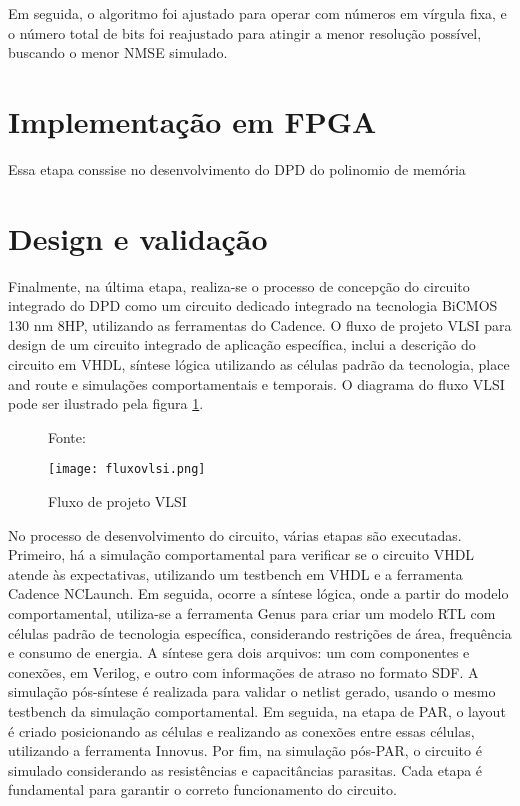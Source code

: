 Em seguida, o algoritmo foi ajustado para operar com números em vírgula fixa, e o número total de bits foi reajustado para atingir a menor resolução possível, buscando o menor NMSE simulado.


\section{Implementação em FPGA}
Essa etapa conssise no desenvolvimento do DPD do polinomio de memória 

\section{Design e validação}
Finalmente, na última etapa, realiza-se o processo de concepção do circuito integrado do DPD como um circuito dedicado integrado na tecnologia BiCMOS 130 nm 8HP, utilizando as ferramentas do Cadence.
O fluxo de projeto VLSI  para design de um circuito integrado de aplicação específica, inclui a descrição do circuito em VHDL, síntese lógica utilizando as células padrão da tecnologia, place and route e simulações comportamentais e temporais. O diagrama do fluxo VLSI pode ser ilustrado pela figura \ref{fig:CMOS2010}.

\begin{figure}[ht!]
    \centering
    \captionsetup{justification=centering}
    \caption*{Fonte: \cite{CMOS2010}}
    \texttt{[image: fluxovlsi.png]}
    \caption{Fluxo de projeto VLSI}
    \label{fig:CMOS2010}
\end{figure}

No processo de desenvolvimento do circuito, várias etapas são executadas. Primeiro, há a simulação comportamental para verificar se o circuito VHDL atende às expectativas, utilizando um testbench em VHDL e a ferramenta Cadence NCLaunch. Em seguida, ocorre a síntese lógica, onde a partir do modelo comportamental, utiliza-se a ferramenta Genus para criar um modelo RTL com células padrão de tecnologia específica, considerando restrições de área, frequência e consumo de energia. A síntese gera dois arquivos: um com componentes e conexões, em Verilog, e outro com informações de atraso no formato SDF. A simulação pós-síntese é realizada para validar o netlist gerado, usando o mesmo testbench da simulação comportamental. Em seguida, na etapa de PAR, o layout é criado posicionando as células e realizando as conexões entre essas células, utilizando a ferramenta Innovus. Por fim, na simulação pós-PAR, o circuito é simulado considerando as resistências e capacitâncias parasitas. Cada etapa é fundamental para garantir o correto funcionamento do circuito.

